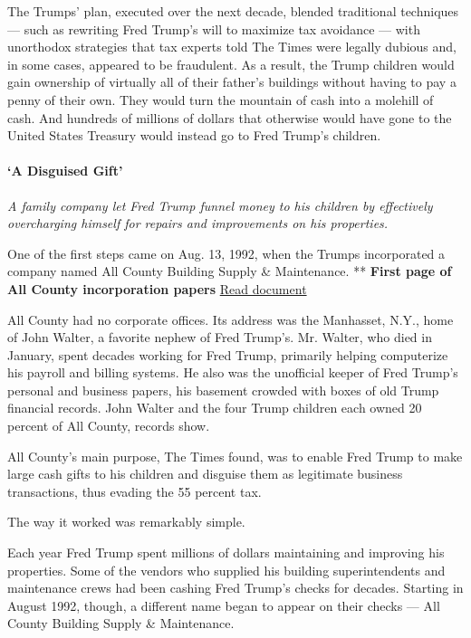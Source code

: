 The Trumps' plan, executed over the next decade, blended traditional
techniques --- such as rewriting Fred Trump's will to maximize tax
avoidance --- with unorthodox strategies that tax experts told The Times
were legally dubious and, in some cases, appeared to be fraudulent. As a
result, the Trump children would gain ownership of virtually all of
their father's buildings without having to pay a penny of their own.
They would turn the mountain of cash into a molehill of cash. And
hundreds of millions of dollars that otherwise would have gone to the
United States Treasury would instead go to Fred Trump's children.

\hypertarget{a-disguised-gift}{%
\paragraph{`A Disguised Gift'}\label{a-disguised-gift}}

\emph{A family company let Fred Trump funnel money to his children by
effectively overcharging himself for repairs and improvements on his
properties.}

One of the first steps came on Aug. 13, 1992, when the Trumps
incorporated a company named All County Building Supply \& Maintenance.
** \textbf{First page of All County incorporation papers}
\href{https://int.graylady3jvrrxbe.onion/data/documenthelper/129-all-county-inc/b4512827482c5ad9ea12/optimized/full.pdf\#page=1}{Read
document}

All County had no corporate offices. Its address was the Manhasset,
N.Y., home of John Walter, a favorite nephew of Fred Trump's. Mr.
Walter, who died in January, spent decades working for Fred Trump,
primarily helping computerize his payroll and billing systems. He also
was the unofficial keeper of Fred Trump's personal and business papers,
his basement crowded with boxes of old Trump financial records. John
Walter and the four Trump children each owned 20 percent of All County,
records show.

All County's main purpose, The Times found, was to enable Fred Trump to
make large cash gifts to his children and disguise them as legitimate
business transactions, thus evading the 55 percent tax.

The way it worked was remarkably simple.

Each year Fred Trump spent millions of dollars maintaining and improving
his properties. Some of the vendors who supplied his building
superintendents and maintenance crews had been cashing Fred Trump's
checks for decades. Starting in August 1992, though, a different name
began to appear on their checks --- All County Building Supply \&
Maintenance.

